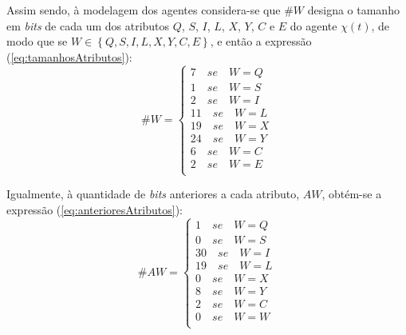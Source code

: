 Assim sendo, à modelagem dos agentes considera-se que $\# W$ designa o tamanho em \textit{bits} de cada um dos atributos $Q$, $S$, $I$, $L$, $X$, $Y$, $C$ e $E$ do agente $\chi(t)$, de modo que se $W \in \left\{Q, S, I, L, X, Y, C, E\right\}$, e então a expressão (\ref{eq:tamanhosAtributos}):
\begin{equation}
\# W=
 \begin{cases} 
 7  \quad se \quad W=Q  \\
 1  \quad se \quad W=S  \\
 
 2  \quad se \quad W=I  \\
 11 \quad se \quad W=L  \\ 
 19 \quad se \quad W=X  \\
 
 24 \quad se \quad W=Y  \\
 6  \quad se \quad W=C  \\
 2  \quad se \quad W=E  \\
 \end{cases}
 \label{eq:tamanhosAtributos}
\end{equation}

Igualmente, à quantidade de \textit{bits} anteriores a cada atributo, $AW$, obtém-se a expressão (\ref{eq:anterioresAtributos}):
\begin{equation}
\# AW=
 \begin{cases}
 1  \quad se \quad W=Q  \\
 0  \quad se \quad W=S  \\
 
 30 \quad se \quad W=I  \\
 19 \quad se \quad W=L  \\ 
 0  \quad se \quad W=X  \\
 
 8  \quad se \quad W=Y  \\
 2  \quad se \quad W=C  \\
 0  \quad se \quad W=W  \\
 \end{cases}
 \label{eq:anterioresAtributos}
\end{equation}

